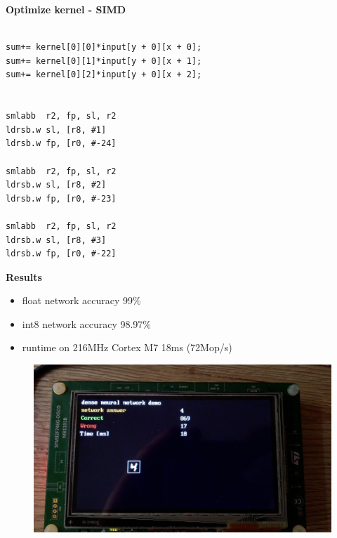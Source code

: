 \documentclass[xcolor=dvipsnames]{beamer}
\begin{document}
\begin{frame}[fragile]
{\bf Optimize kernel - SIMD}



\begin{lstlisting}

sum+= kernel[0][0]*input[y + 0][x + 0];
sum+= kernel[0][1]*input[y + 0][x + 1];
sum+= kernel[0][2]*input[y + 0][x + 2];


smlabb	r2, fp, sl, r2
ldrsb.w	sl, [r8, #1]
ldrsb.w	fp, [r0, #-24]

smlabb	r2, fp, sl, r2
ldrsb.w	sl, [r8, #2]
ldrsb.w	fp, [r0, #-23]

smlabb	r2, fp, sl, r2
ldrsb.w	sl, [r8, #3]
ldrsb.w	fp, [r0, #-22]

\end{lstlisting}


\end{frame}


\begin{frame}{\bf Results}

\begin{itemize}
\item float network accuracy 99\%
\item int8 network accuracy  98.97\%
\item runtime on 216MHz Cortex M7 18ms (72Mop/s)
\end{itemize}

\begin{figure}
  \includegraphics[scale=0.25]{../../pictures/stm32_screenshot.jpg}
\end{figure}

\end{frame}
\end{document}
